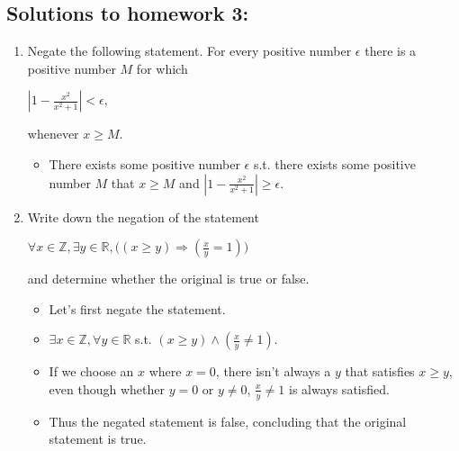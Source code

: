 \documentclass[letterpaper,12pt]{article}
\begin{document}
\subsection*{Solutions to homework 3:}

\begin{enumerate}
\item Negate the following statement. For every positive number $\epsilon$ there is a positive number $M$ for which 
\begin{center}
	$|1-\frac{x^2}{x^2+1}| < \epsilon$,
\end{center}
whenever $x \geq M.$

\begin{itemize}
	\item There exists some positive number $\epsilon$ s.t. there exists some positive number $M$ that $x \geq M$ and $|1-\frac{x^2}{x^2+1} |\geq \epsilon$.
\end{itemize}

\item Write down the negation of the statement 
\begin{center}
	$ \forall x\in \mathbb{Z}, \exists y \in \mathbb{R}, \bigl((x\geq y)\Rightarrow(\frac{x}{y} = 1) \bigr)$
\end{center}
and determine whether the original is true or false.
 
\begin{itemize}
	\item Let's first negate the statement.
	\item $\exists x \in \mathbb{Z},\forall y \in \mathbb{R}$ s.t. $(x \geq y) \wedge(\frac{x}{y} \neq 1)$.
	\item If we choose an $x$ where $x=0$, there isn't always a $y$ that satisfies $x \geq y$, even though whether $y=0$ or $y \neq 0$, $\frac{x}{y} \neq 1$ is always satisfied.
	\item Thus the negated statement is false, concluding that the original statement is true.
\end{itemize}
    

\end{enumerate}
\end{document}
